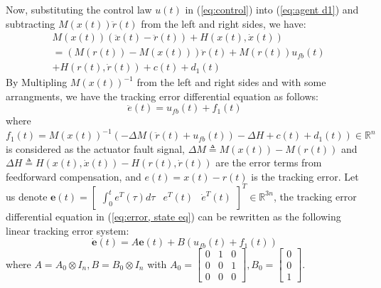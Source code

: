 \documentclass{ieeeaccess}
\newtheorem{remark}{Remark}
\begin{document}
Now, substituting the control law $u(t)$ in (\ref{eq:control}) into (\ref{eq:agent d1}) and subtracting $M(x(t))\ddot{r}(t)$ from the left and right sides, we have:
\begin{equation} \label{eq:agent1}
    \begin{split}
        & M(x(t))(\ddot{x}(t)-\ddot{r}(t)) + H(x(t),\dot{x}(t)) \\
        & =(M(r(t))-M(x(t)))\ddot{r}(t) + M(r(t))u_{fb}(t) \\
        & + H(r(t),\dot{r}(t)) + c(t) + d_1(t)
    \end{split}
\end{equation}
By Multipling $M(x(t))^{-1}$ from the left and right sides and with some arrangments, we have the tracking error differential equation as follows:
\begin{equation} \label{eq:error, state eq}
    \ddot{e}(t) = u_{fb}(t) + f_1(t)
\end{equation}
where $f_1(t) = M(x(t))^{-1}(-\Delta M (\ddot{r}(t)+u_{fb}(t)) -\Delta H + c(t) + d_1(t))\in\mathbb{R}^n$ is considered as the actuator fault signal, $\Delta M \triangleq M(x(t)) - M(r(t))$ and $ \Delta H \triangleq H(x(t),\dot{x}(t)) - H(r(t),\dot{r}(t))$ are the error terms from feedforward compensation, and $e(t)= x(t)-r(t)$ is the tracking error.
Let us denote $\pmb{e}(t)=\begin{bmatrix}
    \int_{0}^{t}e^T(\tau)d\tau & e^T(t) & \dot{e}^T(t)
\end{bmatrix}^T\in\mathbb{R}^{3n}$, the tracking error differential equation in (\ref{eq:error, state eq}) can be rewritten as the following linear tracking error system:
\begin{equation} \label{eq:linear f1}
    \dot{\pmb{e}}(t)=A\pmb{e}(t)+B(u_{fb}(t)+f_1(t))
\end{equation}
where $ A = A_0\otimes I_n, B = B_0\otimes I_n$
with $A_0 = \begin{bmatrix}
    0 & 1 & 0 \\ 0 & 0 & 1 \\ 0 & 0 & 0
\end{bmatrix}, B_0 = \begin{bmatrix}
0 \\ 0 \\ 1
\end{bmatrix}$. 
\end{document}
